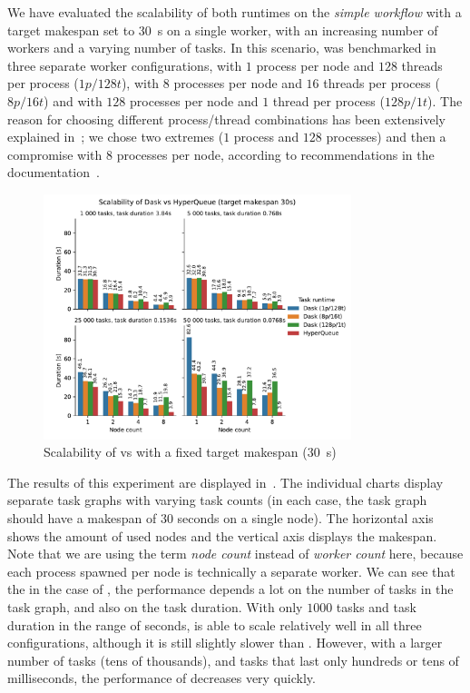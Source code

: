 We have evaluated the scalability of both runtimes on the \emph{simple workflow} with a target
makespan set to \SI{30}{\second} on a single worker, with an increasing number of workers
and a varying number of tasks. In this scenario, \dask{} was benchmarked in three
separate worker configurations, with $1$ process per node and
$128$ threads per process ($1p/128t$), with $8$
processes per node and $16$ threads per process ($8p/16t$) and with
$128$ processes per node and $1$ thread per process
($128p/1t$). The reason for choosing different process/thread combinations has been
extensively explained in~; we chose two extremes ($1$
process and $128$ processes) and then a compromise with $8$
processes per node, according to recommendations in the \dask{}
documentation~\cite{dask-thread-recommendation}.

\begin{figure}[h]
	\centering
	\includegraphics[width=0.8\textwidth]{imgs/hq/charts/dask-vs-hq-sleep}
	\caption{Scalability of \hyperqueue{} vs \dask{} with a fixed target makespan
	(\SI{30}{\second})}
	\label{fig:hq-dask-sleep}
\end{figure}

The results of this experiment are displayed in~. The individual charts
display separate task graphs with varying task counts (in each case, the task graph should have a
makespan of $30$ seconds on a single node). The horizontal axis shows the amount
of used nodes and the vertical axis displays the makespan. Note that we are using the term
\emph{node count} instead of \emph{worker count} here, because each
\dask{} process spawned per node is technically a separate worker. We can see that
the in the case of \dask{}, the performance depends a lot on the number of tasks in
the task graph, and also on the task duration. With only $1000$ tasks and task
duration in the range of seconds, \dask{} is able to scale relatively well in all
three configurations, although it is still slightly slower than \hyperqueue{}. However,
with a larger number of tasks (tens of thousands), and tasks that last only hundreds or tens of
milliseconds, the performance of \dask{} decreases very quickly.

